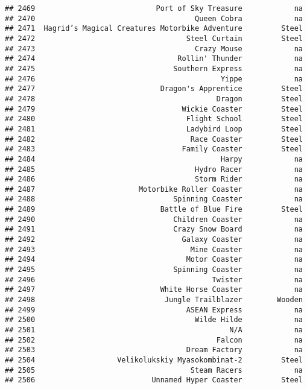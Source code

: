 \documentclass[
]{article}
\begin{document}
\begin{verbatim}
## 2469                            Port of Sky Treasure            na
## 2470                                     Queen Cobra            na
## 2471  Hagrid’s Magical Creatures Motorbike Adventure         Steel
## 2472                                   Steel Curtain         Steel
## 2473                                     Crazy Mouse            na
## 2474                                 Rollin' Thunder            na
## 2475                                Southern Express            na
## 2476                                           Yippe            na
## 2477                             Dragon's Apprentice         Steel
## 2478                                          Dragon         Steel
## 2479                                  Wickie Coaster         Steel
## 2480                                   Flight School         Steel
## 2481                                   Ladybird Loop         Steel
## 2482                                    Race Coaster         Steel
## 2483                                  Family Coaster         Steel
## 2484                                           Harpy            na
## 2485                                     Hydro Racer            na
## 2486                                     Storm Rider            na
## 2487                        Motorbike Roller Coaster            na
## 2488                                Spinning Coaster            na
## 2489                             Battle of Blue Fire         Steel
## 2490                                Children Coaster            na
## 2491                                Crazy Snow Board            na
## 2492                                  Galaxy Coaster            na
## 2493                                    Mine Coaster            na
## 2494                                   Motor Coaster            na
## 2495                                Spinning Coaster            na
## 2496                                         Twister            na
## 2497                             White Horse Coaster            na
## 2498                              Jungle Trailblazer        Wooden
## 2499                                   ASEAN Express            na
## 2500                                     Wilde Hilde            na
## 2501                                             N/A            na
## 2502                                          Falcon            na
## 2503                                   Dream Factory            na
## 2504                   Velikolukskiy Myasokombinat-2         Steel
## 2505                                    Steam Racers            na
## 2506                           Unnamed Hyper Coaster         Steel

\end{verbatim}
\end{document}

